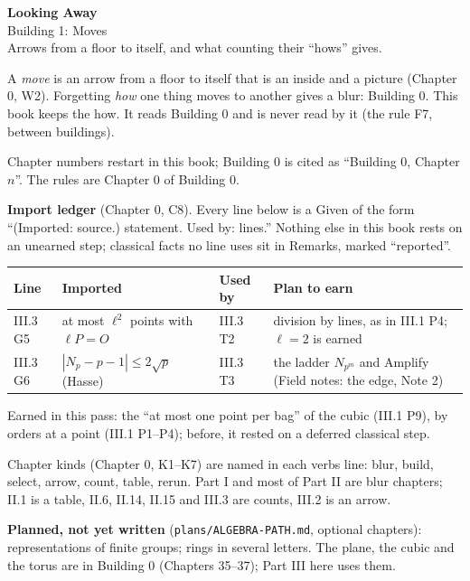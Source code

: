 

\begin{center}
{\Large\bfseries Looking Away}\\[4pt]
{\large Building 1: Moves}\\[4pt]
{\small Arrows from a floor to itself, and what counting their ``hows'' gives.}
\end{center}
\renewcommand{\contentsname}{Contents}
\tableofcontents
\bigskip

A \emph{move} is an arrow from a floor to itself that is an inside and a picture (Chapter 0, W2). Forgetting \emph{how} one thing moves to another gives a blur: Building 0. This book keeps the how. It reads Building 0 and is never read by it (the rule F7, between buildings).

Chapter numbers restart in this book; Building 0 is cited as ``Building 0, Chapter $n$''. The rules are Chapter 0 of Building 0.

\textbf{Import ledger} (Chapter 0, C8). Every line below is a Given of the form ``(Imported: source.) statement. Used by: lines.'' Nothing else in this book rests on an unearned step; classical facts no line uses sit in Remarks, marked ``reported''.
\begin{center}
\renewcommand{\arraystretch}{1.25}
\begin{tabular}{@{}l p{4.6cm} l p{4.1cm}@{}}
\textbf{Line} & \textbf{Imported} & \textbf{Used by} & \textbf{Plan to earn} \\ \hline
III.3 G5 & at most $\ell^2$ points with $\ell P = O$ & III.3 T2 & division by lines, as in III.1 P4; $\ell = 2$ is earned \\
III.3 G6 & $|N_p - p - 1| \le 2\sqrt p$ (Hasse) & III.3 T3 & the ladder $N_{p^m}$ and Amplify (Field notes: the edge, Note 2) \\
\end{tabular}
\end{center}
Earned in this pass: the ``at most one point per bag'' of the cubic (III.1 P9), by orders at a point (III.1 P1--P4); before, it rested on a deferred classical step.

Chapter kinds (Chapter 0, K1--K7) are named in each verbs line: blur, build, select, arrow, count, table, rerun. Part I and most of Part II are blur chapters; II.1 is a table, II.6, II.14, II.15 and III.3 are counts, III.2 is an arrow.

\textbf{Planned, not yet written} (\texttt{plans/ALGEBRA-PATH.md}, optional chapters): representations of finite groups; rings in several letters. The plane, the cubic and the torus are in Building 0 (Chapters 35--37); Part III here uses them.
\newpage

\newpage

\newpage


